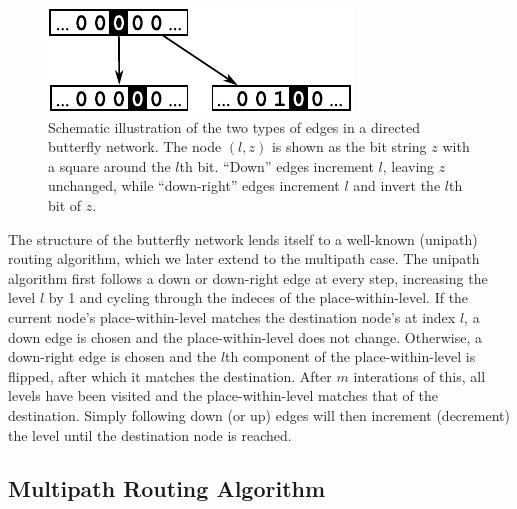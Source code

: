 \documentclass{sig-alternate-05-2015}
\begin{document}
\begin{figure}
\begin{center}
\includegraphics{fig-butterfly.pdf}
\end{center}
\caption{
Schematic illustration of the two types of edges in a directed butterfly
network.
The node $(l,z)$ is shown as the bit string $z$ with a square around the
$l$th bit.
``Down'' edges increment $l$, leaving $z$ unchanged,
while ``down-right'' edges increment $l$ and invert the $l$th bit of $z$.
\label{fig:butterfly}
}
\end{figure}

The structure of the butterfly network lends itself to a well-known
(unipath) routing algorithm,
which we later extend to the multipath case.
The unipath algorithm first follows a down or down-right edge at every step,
increasing the level $l$ by 1 and cycling through the
indeces of the place-within-level.
If the current node's place-within-level matches the destination node's at
index $l$,
a down edge is chosen and the place-within-level does not change.
Otherwise, a down-right edge is chosen and the $l$th component of the
place-within-level is flipped,
after which it matches the destination.
After $m$ interations of this, all levels have been visited
and the place-within-level matches that of the destination.
Simply following down (or up) edges will then increment (decrement) the
level until the destination node is reached.

\subsection{Multipath Routing Algorithm}
\end{document}
